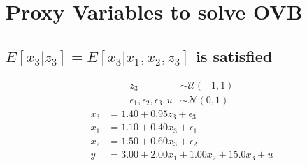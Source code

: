 \section{Proxy Variables to solve OVB}

\subsection{$E[x_3 | z_3] = E[x_3 | x_1 ,x_2 , z_3]$ is satisfied}

\begin{align*}
    z_3 &\sim \mathcal{U}(-1 , 1)\\
    \epsilon_1 , \epsilon_2 , \epsilon_3 , u &\sim \mathcal{N}(0 , 1)
\end{align*}
\begin{align*}
        x_3 &= 1.40 + 0.95  z_3 + \epsilon_3\\
    x_1 &= 1.10 + 0.40  x_3  + \epsilon_1\\
    x_2 &= 1.50 + 0.60  x_3  + \epsilon_2\\
     y   &= 3.00 + 2.00 x_1 + 1.00 x_2 + 15.0 x_3 + u
\end{align*}

